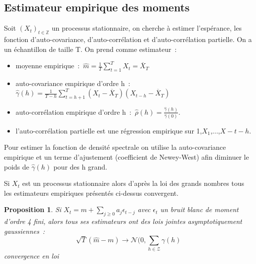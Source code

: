\documentclass[11pt]{scrartcl} %
\newtheorem{pro}[theorem]{Proposition}
\begin{document}
\subsection{Estimateur empirique des moments}
Soit $(X_t)_{t\in\mathbb{Z}}$ un processus stationnaire, on cherche à estimer l'espérance, les fonction d'auto-covariance, d'auto-corrélation et d'auto-corrélation partielle. On a un échantillon de taille T. On prend comme estimateur~:
\begin{itemize}
\item moyenne empirique~:~$\hat{m}=\frac{1}{T}\sum_{t=1}^TX_t=\overline{X}_T$\\
\item auto-covariance empirique d'ordre h~:~$\hat{\gamma}(h)=\frac{1}{T-h}\sum_{t=h+1}^T(X_t-\overline{X}_T)(X_{t-h}-\overline{X}_T)$\\
\item auto-corrélation empirique d'ordre h~:~$\hat{\rho}(h)=\frac{\hat{\gamma}(h)}{\hat{\gamma}(0)}$.\\
\item l'auto-corrélation partielle est une régression empirique sur 1,$X_1$,...,$X-{t-h}$.
\end{itemize}
Pour estimer la fonction de densité spectrale on utilise la auto-covariance empirique et un terme d'ajustement (coefficient de Newey-West) afin diminuer le poids de $\hat{\gamma}(h)$ pour des h grand.


Si $X_t$ est un processus stationnaire alors d'après la loi des grands nombres tous les estimateurs empiriques présentés ci-dessus convergent.

\begin{pro}
Si $X_t=m+\sum_{j\geq 0}a_j\epsilon_{t-j}$ avec $\epsilon_t$ un bruit blanc de moment d'ordre 4 fini, alors tous ses estimateurs ont des lois jointes asymptotiquement gaussiennes~:
$$
\sqrt{T}\left(\hat{m}-m\right)\rightarrow \mathcal{N}(0,\sum_{h\in\mathcal{Z}}\gamma(h)
$$
convergence en loi
\end{pro}
\end{document}
